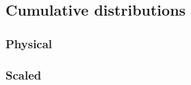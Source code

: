 \documentclass[twocolumn]{aastex631}
\newcommand{\kc}[1]{\textcolor{yellow}{\textbf{kc: #1}} }
\newcommand{\paircat}{\textit{Full Pair Catalog}}
\newcommand{\Rphys}{\ensuremath{\rm R_{phys}}}
\newcommand{\rsep}{\ensuremath{\rm r_{sep}}}
\begin{document}
\subsection{Cumulative distributions}
\subsubsection{Physical}
\subsubsection{Scaled}

\end{document}
